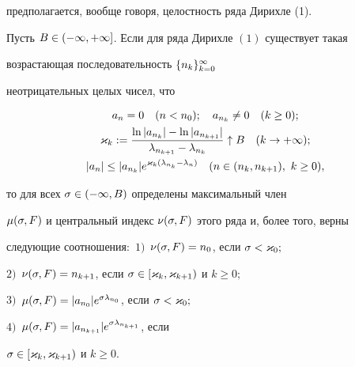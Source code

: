 предполагается, вообще говоря, целостность ряда Дирихле (1).





\begin{lem}


Пусть $B\in (-\infty,+\infty]$. Если для ряда Дирихле $(1)$ существует такая


возрастающая последовательность $\{n_k\}_{k=0}^\infty$


неотрицательных целых чисел, что


\begin{gather*}


a_n=0\q (n<n_0);\q a_{n_k}\ne0\q (k\ge 0);\\


\k_k:=\frac{\ln|a_{n_k}|-\ln|a_{n_{k+1}}|}{\l_{n_{k+1}}-\l_{n_k}}\u


B\q (k\to+\i);\\


|a_n|\le|a_{n_k}|e^{\k_k(\l_{n_k}-\l_n)}\q (n\in(n_k,n_{k+1}),\


k\ge 0),


\end{gather*}


то для всех $\sigma\in(-\infty,B)$ определены максимальный член


$\mu(\sigma,F)$ и центральный индекс $\nu(\sigma,F)$ этого ряда и, более того, верны


следующие соотношения${:}$ $1)$~$\nu(\sigma,F)=n_0$, если $\sigma<\varkappa_0;$


$2)$~$\nu(\sigma,F)=n_{k+1}$, если $\sigma\in[\varkappa_k,\varkappa_{k+1})$ и $k\ge 0;$


$3)$~$\mu(\sigma,F)=|a_{n_0}|e^{\sigma\lambda_{n_0}}$, если $\sigma<\varkappa_0;$


$4)$~$\mu(\sigma,F)=|a_{n_{k+1}}|e^{\sigma\lambda_{n_{k+1}}}$, если


$\sigma\in[\varkappa_k,\varkappa_{k+1})$ и $k\ge 0$.


\end{lem}





